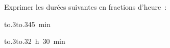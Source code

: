 \documentclass[exercice]{thedocument}%
\begin{document}
%
Exprimer les durées suivantes en fractions d'heure~:\par\vskip10pt
\hbox{\hbox to.3\hbox to.345 min}\par\vskip5pt
\hbox{\hbox to.3\hbox to.32 h 30 min}\par
\end{document}

